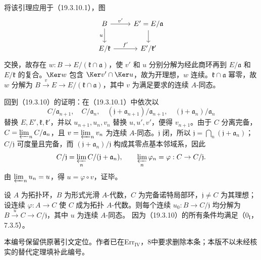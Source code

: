 将该引理应用于（19.3.10.1），图
\[
\begin{tikzcd}
 B\arrow[r,"v'"]\arrow[d,"u"']&E'=E/\mathfrak a\arrow[d]\\
 E/\mathfrak k\arrow[r,"f'"]&E'/\mathfrak k'
\end{tikzcd}
\]
交换，故存在 $w:B\to E/(\mathfrak k\cap\mathfrak a)$，使 $v'$ 和 $u$ 分别分解为经此商环再到 $E/\mathfrak a$ 和 $E/\mathfrak k$ 的复合。$\Ker w$ 包含 $\Ker v'\cap\Ker u$，故为开理想，$w$ 连续。$\mathfrak k\cap\mathfrak a$ 幂零，故 $w$ 分解为 $B\xrightarrow{v}E\to E/(\mathfrak k\cap\mathfrak a)$，其中 $v$ 为满足要求的连续 $A$-同态。

回到（19.3.10）的证明：在（19.3.10.1）中依次以
\[
 C/\mathfrak a_{n+1},\quad C/\mathfrak a_n,\quad
 (\mathfrak j+\mathfrak a_{n+1})/\mathfrak a_{n+1},\quad
 (\mathfrak j+\mathfrak a_n)/\mathfrak a_n
\]
替换 $E,E',\mathfrak k,\mathfrak k'$，并以 $u_{n+1},u_n,v_n$ 替换 $u,u',v'$，便得 $v_{n+1}$。由于 $C$ 分离完备，$C=\varprojlim_n C/\mathfrak a_n$，且 $v=\varprojlim_n v_n$ 为连续 $A$-同态。$\mathfrak j$ 闭，所以 $\mathfrak j=\bigcap_n(\mathfrak j+\mathfrak a_n)$；$C/\mathfrak j$ 可度量且完备，而 $(\mathfrak j+\mathfrak a_n)/\mathfrak j$ 构成其零点基本邻域系，因此
\[
 C/\mathfrak j=\varprojlim_n C/(\mathfrak j+\mathfrak a_n),
 \qquad \varprojlim_n\varphi_n=\varphi:C\to C/\mathfrak j.
\]
由 $\varprojlim_nu_n=u$，得 $u=\varphi\circ v$，证毕。

设 $A$ 为拓扑环，$B$ 为形式光滑 $A$-代数，$C$ 为完备诺特局部环，$\mathfrak j\ne C$ 为其理想；设连续 $\varphi:A\to C$ 使 $C$ 成为拓扑 $A$-代数。则每个连续 $u_0:B\to C/\mathfrak j$ 均分解为 $B\xrightarrow{u}C\to C/\mathfrak j$，其中 $u$ 为连续 $A$-同态。
因为（19.3.10）的所有条件均满足（$0_{\mathrm I}$，7.3.5）。

本编号保留供原著引文定位。作者已在Err$_{\mathrm{IV}}$，8中要求删除本条；本版不以未经核实的替代定理填补此编号。
